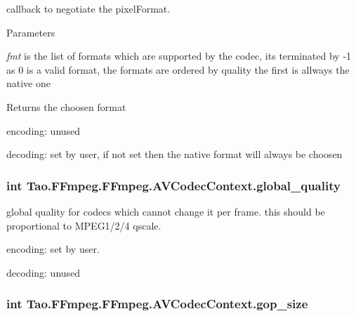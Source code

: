\label{struct_tao_1_1_f_fmpeg_1_1_f_fmpeg_1_1_a_v_codec_context_aa1e2ce4aee944643c21c6d9ebd11737c}
callback to negotiate the pixelFormat. 
\begin{DoxyParams}{Parameters}
\item[{\em fmt}]is the list of formats which are supported by the codec, its terminated by -\/1 as 0 is a valid format, the formats are ordered by quality the first is allways the native one \end{DoxyParams}
\begin{DoxyReturn}{Returns}
the choosen format
\begin{DoxyItemize}
\item encoding: unused
\item decoding: set by user, if not set then the native format will always be choosen 
\end{DoxyItemize}
\end{DoxyReturn}
\hypertarget{struct_tao_1_1_f_fmpeg_1_1_f_fmpeg_1_1_a_v_codec_context_a639cea0ca1703068b154f63533c3810e}{
\subsubsection[{global\_\-quality}]{\setlength{\rightskip}{0pt plus 5cm}int {\bf Tao.FFmpeg.FFmpeg.AVCodecContext.global\_\-quality}}}
\label{struct_tao_1_1_f_fmpeg_1_1_f_fmpeg_1_1_a_v_codec_context_a639cea0ca1703068b154f63533c3810e}
global quality for codecs which cannot change it per frame. this should be proportional to MPEG1/2/4 qscale.
\begin{DoxyItemize}
\item encoding: set by user.
\item decoding: unused 
\end{DoxyItemize}\hypertarget{struct_tao_1_1_f_fmpeg_1_1_f_fmpeg_1_1_a_v_codec_context_a8763961562428a870c1c8d8ad4111777}{
\subsubsection[{gop\_\-size}]{\setlength{\rightskip}{0pt plus 5cm}int {\bf Tao.FFmpeg.FFmpeg.AVCodecContext.gop\_\-size}}}
